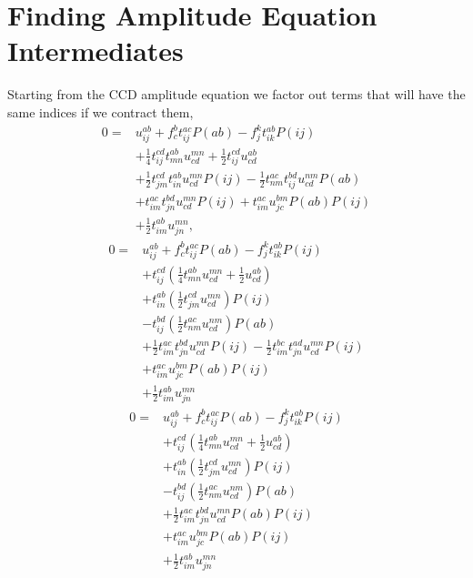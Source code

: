 \documentclass[
    a4paper, aps, twocolumn, floatfix, superscriptaddress,
    nofootinbib]{revtex4-1}
\newcommand{\1}{\mathds{1}}
\begin{document}
\section{Finding Amplitude Equation Intermediates}
    \label{app:intermediates}
    Starting from the CCD amplitude equation we factor out terms that will have the same
    indices if we contract them,
    \begin{equation}
        \begin{aligned}
        0 =& u^{ab}_{ij} + f^b_c t^{ac}_{ij}P(ab) - f^k_jt^{ab}_{ik}P(ij) \\
          &+ \frac{1}{4}t^{cd}_{ij} t^{ab}_{mn} u^{mn}_{cd} + \frac{1}{2}t^{cd}_{ij} u^{ab}_{cd} \\
          &+ \frac{1}{2}t^{cd}_{jm} t^{ab}_{in} u^{mn}_{cd} P(ij) - \frac{1}{2}t^{ac}_{nm} t^{bd}_{ij} u^{nm}_{cd} P(ab) \\
          &+ t^{ac}_{im} t^{bd}_{jn} u^{mn}_{cd} P(ij) + t^{ac}_{im} u^{bm}_{jc} P(ab) P(ij) \\
          &+ \frac{1}{2}t^{ab}_{im} u^{mn}_{jn},
        \end{aligned}
    \end{equation}
    \begin{equation}
        \begin{aligned}
        0 =& u^{ab}_{ij} + f^b_c t^{ac}_{ij}P(ab) - f^k_jt^{ab}_{ik}P(ij) \\
          &+ t^{cd}_{ij} \left(\frac{1}{4}t^{ab}_{mn} u^{mn}_{cd} + \frac{1}{2} u^{ab}_{cd} \right) \\
          &+  t^{ab}_{in} \left(\frac{1}{2} t^{cd}_{jm} u^{mn}_{cd}\right) P(ij) \\
          &- t^{bd}_{ij} \left(\frac{1}{2}t^{ac}_{nm}  u^{nm}_{cd}\right) P(ab) \\
          &+ \frac{1}{2}t^{ac}_{im} t^{bd}_{jn} u^{mn}_{cd} P(ij) - \frac{1}{2}t^{bc}_{im} t^{ad}_{jn} u^{mn}_{cd} P(ij)\\
          &+ t^{ac}_{im} u^{bm}_{jc} P(ab) P(ij) \\
          &+ \frac{1}{2}t^{ab}_{im} u^{mn}_{jn}
        \end{aligned}
    \end{equation}
    \begin{equation}
        \begin{aligned}
        0 =& u^{ab}_{ij} + f^b_c t^{ac}_{ij}P(ab) - f^k_jt^{ab}_{ik}P(ij) \\
          &+ t^{cd}_{ij} \left(\frac{1}{4}t^{ab}_{mn} u^{mn}_{cd} + \frac{1}{2} u^{ab}_{cd} \right) \\
          &+  t^{ab}_{in} \left(\frac{1}{2} t^{cd}_{jm} u^{mn}_{cd}\right) P(ij) \\
          &- t^{bd}_{ij} \left(\frac{1}{2}t^{ac}_{nm}  u^{nm}_{cd}\right) P(ab) \\
          &+ \frac{1}{2}t^{ac}_{im} t^{bd}_{jn} u^{mn}_{cd} P(ab) P(ij) \\
          &+ t^{ac}_{im} u^{bm}_{jc} P(ab) P(ij) \\
          &+ \frac{1}{2}t^{ab}_{im} u^{mn}_{jn}
        \end{aligned}
    \end{equation}
\end{document}

